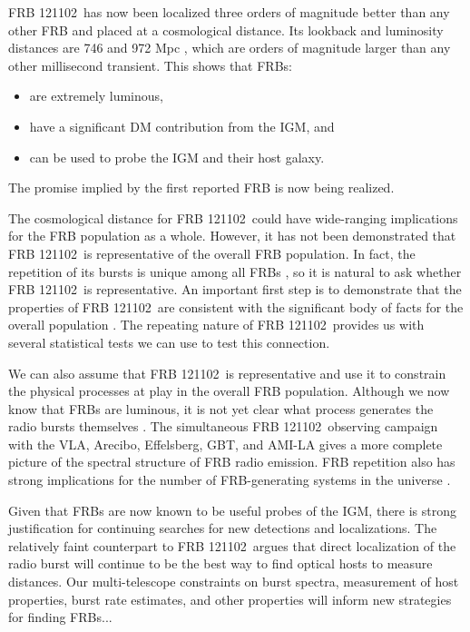 \documentclass{emulateapj}
\newcommand{\frb}{FRB 121102}
\begin{document}
\frb\ has now been localized three orders of magnitude better than any other FRB and placed at a cosmological distance. Its lookback and luminosity distances are 746 and 972 Mpc \citep{planck15}, which are orders of magnitude larger than any other millisecond transient. This shows that FRBs:
\begin{itemize}
 \item are extremely luminous, 
 \item have a significant DM contribution from the IGM, and
 \item can be used to probe the IGM and their host galaxy.
\end{itemize}
The promise implied by the first reported FRB \citep{2007Sci...318..777L} is now being realized.

The cosmological distance for \frb\ could have wide-ranging implications for the FRB population as a whole. However, it has not been demonstrated that \frb\ is representative of the overall FRB population. In fact, the repetition of its bursts is unique among all FRBs \citep{2015MNRAS.454..457P}, so it is natural to ask whether \frb\ is representative. An important first step is to demonstrate that the properties of \frb\ are consistent with the significant body of facts for the overall population \citep{2015MNRAS.451.3278M, 2016MPLA...3130013K}. The repeating nature of \frb\ provides us with several statistical tests we can use to test this connection.

We can also assume that \frb\ is representative and use it to constrain the physical processes at play in the overall FRB population. Although we now know that FRBs are luminous, it is not yet clear what process generates the radio bursts themselves \citep{2014PhRvD..89j3009K, 2014ApJ...785L..26L, 2016MNRAS.457..232C}. The simultaneous \frb\ observing campaign with the VLA, Arecibo, Effelsberg, GBT, and AMI-LA gives a more complete picture of the spectral structure of FRB radio emission. FRB repetition also has strong implications for the number of FRB-generating systems in the universe \citep{2016MNRAS.458L..89C}.

Given that FRBs are now known to be useful probes of the IGM, there is strong justification for continuing searches for new detections and localizations. The relatively faint counterpart to \frb\ argues that direct localization of the radio burst will continue to be the best way to find optical hosts to measure distances. Our multi-telescope constraints on burst spectra, measurement of host properties, burst rate estimates, and other properties will inform new strategies for finding FRBs...
\end{document}
